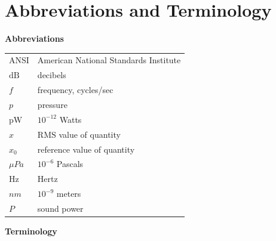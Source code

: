 \documentclass[
]{book}
\begin{document}
\hypertarget{abbreviations-and-terminology}{%
\section{Abbreviations and Terminology}\label{abbreviations-and-terminology}}

\textbf{Abbreviations}

\begin{longtable}[]{@{}ll@{}}
\toprule
\endhead
ANSI & American National Standards Institute\tabularnewline
\(\text{dB}\) & decibels\tabularnewline
\(f\) & frequency, cycles/sec\tabularnewline
\(p\) & pressure\tabularnewline
\(\text{pW}\) & \(10^{-12}\) Watts\tabularnewline
\(x\) & \(\mathrm{RMS}\) value of quantity\tabularnewline
\(x_0\) & reference value of quantity\tabularnewline
\(\mu Pa\) & \(10^{-6}\) Pascals\tabularnewline
\(\text{Hz}\) & Hertz\tabularnewline
\(nm\) & \(10^{-9}\) meters\tabularnewline
\(P\) & sound power\tabularnewline
\bottomrule
\end{longtable}

\textbf{Terminology}
\end{document}
